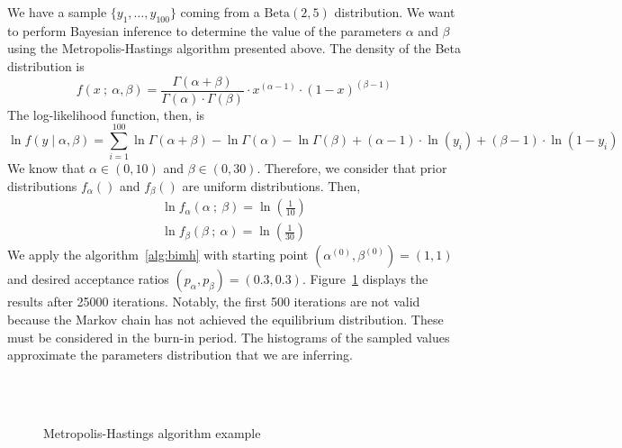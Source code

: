\documentclass[11pt,fleqn]{book} %
\begin{document}
\begin{example}
	We have a sample $\{y_1,\dots,y_{100}\}$ coming from a $\text{Beta}(2,5)$ 
	distribution. We want to perform Bayesian inference to determine the value 
	of the parameters $\alpha$ and $\beta$ using the Metropolis-Hastings 
	algorithm presented above. The density of the Beta distribution is
	\begin{displaymath}
		f(x\ ;\ \alpha, \beta) = 
		\frac{\Gamma(\alpha+\beta)}{\Gamma(\alpha) \cdot \Gamma(\beta)} 
		\cdot x^{(\alpha-1)} \cdot (1-x)^{(\beta-1)}
	\end{displaymath}
	The log-likelihood function, then, is
	\begin{displaymath}
		\ln f(y \mid \alpha, \beta) = 
		\displaystyle \sum_{i=1}^{100} 
		\ln \Gamma(\alpha+\beta) - \ln \Gamma(\alpha) - \ln \Gamma(\beta) +
		(\alpha-1) \cdot \ln(y_i) + (\beta-1) \cdot \ln(1-y_i)
	\end{displaymath}
	We know that $\alpha \in (0,10)$ and $\beta \in (0,30)$. Therefore, we 
	consider that prior distributions $f_{\alpha}()$ and $f_{\beta}()$ are 
	uniform distributions. Then,
	\begin{displaymath}
		\begin{array}{l}
			\ln f_{\alpha}(\alpha \ ;\ \beta) = \ln(\frac{1}{10})
			\\
			\ln f_{\beta}(\beta \ ;\ \alpha) = \ln(\frac{1}{30})
		\end{array}
	\end{displaymath}
	We apply the algorithm~\ref{alg:bimh} with starting point 
	$\left(\alpha^{(0)},\beta^{(0)}\right)=(1,1)$ and 
	desired acceptance ratios $(p_{\alpha},p_{\beta})=(0.3,0.3)$.
	Figure~\ref{fig:mhbd} displays the results after \num{25000} iterations.
	Notably, the first 500 iterations are not valid because the Markov 
	chain has not achieved the equilibrium distribution. These must be 
	considered in the burn-in period. The histograms of the sampled values
	approximate the parameters distribution that we are inferring.
\end{example}

\begin{figure}[!ht]
	\centering
	\\
	\\
	\caption{Metropolis-Hastings algorithm example}
	\label{fig:mhbd}
\end{figure}
\end{document}
